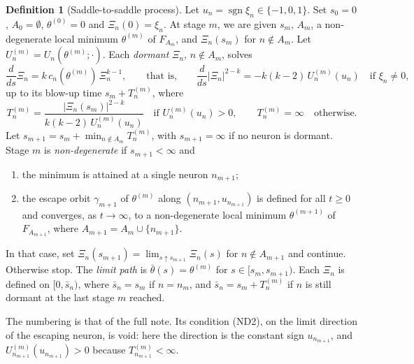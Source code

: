 \documentclass[11pt]{article}
\theoremstyle{definition}
\newtheorem{definition}{Definition}
\theoremstyle{remark}
\newcommand{\sgn}{\operatorname{sgn}}
\newcommand{\ND}[1]{\textup{(ND#1)}}
\begin{document}
\begin{definition}[Saddle-to-saddle process]\label{def:process}
Let $u_n=\sgn\xi_n\in\{-1,0,1\}$. Set $s_0=0$, $A_0=\emptyset$, $\theta^{(0)}=0$ and $\Xi_n(0)=\xi_n$. At stage $m$, we are given $s_m$, $A_m$, a non-degenerate local minimum $\theta^{(m)}$ of $F_{A_m}$, and $\Xi_n(s_m)$ for $n\notin A_m$. Let $U^{(m)}_n=U_n(\theta^{(m)};\cdot)$. Each \emph{dormant} $\Xi_n$, $n\notin A_m$, solves
\begin{equation}\label{eq:dormant}
\frac{d}{ds}\Xi_n=k\,c_n(\theta^{(m)})\,\Xi_n^{k-1},\qquad\text{that is,}\qquad \frac{d}{ds}|\Xi_n|^{2-k}=-k(k-2)\,U^{(m)}_n(u_n)\quad\text{if }\xi_n\ne0,
\end{equation}
up to its blow-up time $s_m+T^{(m)}_n$, where
\[
T^{(m)}_n=\frac{|\Xi_n(s_m)|^{2-k}}{k(k-2)\,U^{(m)}_n(u_n)}\quad\text{if }U^{(m)}_n(u_n)>0,\qquad T^{(m)}_n=\infty\quad\text{otherwise.}
\]
Let $s_{m+1}=s_m+\min_{n\notin A_m}T^{(m)}_n$, with $s_{m+1}=\infty$ if no neuron is dormant. Stage $m$ is \emph{non-degenerate} if $s_{m+1}<\infty$ and
\begin{enumerate}[label=\textup{(ND\arabic*)},leftmargin=4em,nosep]
\item the minimum is attained at a single neuron $n_{m+1}$;
\setcounter{enumi}{2}
\item the escape orbit $\gamma_{m+1}$ of $\theta^{(m)}$ along $(n_{m+1},u_{n_{m+1}})$ is defined for all $t\ge0$ and converges, as $t\to\infty$, to a non-degenerate local minimum $\theta^{(m+1)}$ of $F_{A_{m+1}}$, where $A_{m+1}=A_m\cup\{n_{m+1}\}$.
\end{enumerate}
In that case, set $\Xi_n(s_{m+1})=\lim_{s\uparrow s_{m+1}}\Xi_n(s)$ for $n\notin A_{m+1}$ and continue. Otherwise stop. The \emph{limit path} is $\bar\theta(s)=\theta^{(m)}$ for $s\in[s_m,s_{m+1})$. Each $\Xi_n$ is defined on $[0,\bar s_n)$, where $\bar s_n=s_m$ if $n=n_m$, and $\bar s_n=s_m+T^{(m)}_n$ if $n$ is still dormant at the last stage $m$ reached.
\end{definition}

The numbering is that of the full note. Its condition \ND2, on the limit direction of the escaping neuron, is void: here the direction is the constant sign $u_{n_{m+1}}$, and $U^{(m)}_{n_{m+1}}(u_{n_{m+1}})>0$ because $T^{(m)}_{n_{m+1}}<\infty$.
\end{document}
